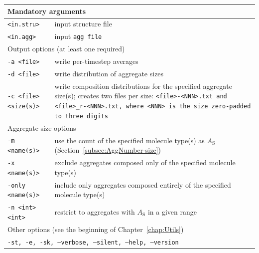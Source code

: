\noindent
\begin{longtable}{p{}p{}}
  \toprule
  \multicolumn{2}{l}{Mandatory arguments}\\
  \midrule
  \tt{<in.stru>} & input structure file\\
  \tt{<in.agg>}  & input \tt{agg} file\\
  \toprule
  \multicolumn{2}{l}{Output options (at least one required)}\\
  \midrule
  \tt{-a <file>}           & write per-timestep averages\\
  \tt{-d <file>}           & write distribution of aggregate sizes\\
  \tt{-c <file> <size(s)>} & write composition distributions for the
    specified aggregate size(s); creates two files per size:
    \tt{<file>-<NNN>.txt} and \tt{<file>_r-<NNN>.txt}, where
    \tt{<NNN>} is the size zero-padded to three digits\\
  \toprule
  \multicolumn{2}{l}{Aggregate size options}\\
  \midrule
  \tt{-m <name(s)>}    & use the count of the specified molecule type(s) as
    $A_\text{S}$ (Section~\ref{subsec:AggNumber-size})\\
  \tt{-x <name(s)>}    & exclude aggregates composed only of the specified
    molecule type(s)\\
  \tt{-only <name(s)>} & include only aggregates composed entirely of the
    specified molecule type(s)\\
  \tt{-n <int> <int>}  & restrict to aggregates with $A_\text{S}$ in a given
    range\\
  \midrule
  \multicolumn{2}{l}{Other options (see the beginning of
                     Chapter~\ref{chap:Utils})}\\
  \midrule
  \multicolumn{2}{l}{\tt{-st},
                     \tt{-e},
                     \tt{-sk},
                     \tt{--verbose},
                     \tt{--silent},
                     \tt{--help},
                     \tt{--version}}\\
  \bottomrule
\end{longtable}


